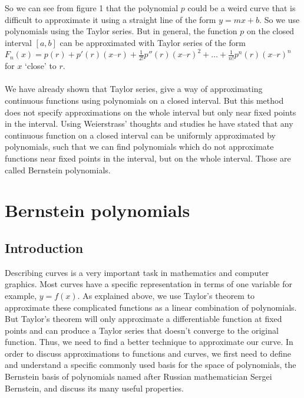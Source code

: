 \documentclass{article}
\begin{document}
So we can see from figure 1 that the polynomial $p$ could be a weird curve that is difficult to approximate it using a straight line of the form $y=mx+b$.
So we use polynomials using the Taylor series.
But in general, the function $p$ on the closed interval $[a,b]$ can be approximated with Taylor series of the form $F_n(x) = p(r) + p'(r)(x – r) + \frac{1}{2!}p''(r) (x – r)^2 + … + \frac{1}{n!} p^n(r)(x – r)^n$ for $x$ `close' to $r$.
\paragraph{}
We have already shown that Taylor series, give a way of approximating continuous functions using polynomials on a closed interval. But this method does not specify approximations on the whole interval but only near fixed points in the interval. Using Weierstrass’ thoughts and studies he have stated that any continuous function on a closed interval can be uniformly approximated by polynomials, such that we can find polynomials which do not approximate functions near fixed points in the interval, but on the whole interval. Those are called Bernstein polynomials.
\section{Bernstein polynomials}
\subsection{Introduction}
Describing curves is a very important task in mathematics and computer graphics. Most curves have a specific  representation in terms of one variable for example, $y = f(x)$. As explained above, we use Taylor’s theorem to approximate these complicated functions as a linear combination of polynomials. But Taylor’s theorem will only approximate a differentiable function at fixed points and can produce a Taylor series that doesn’t converge to the original function. Thus, we need to find a better technique to approximate our curve.
In order to discuss approximations to functions and curves, we first need to define and understand a specific commonly used basis for the space of polynomials, the Bernstein basis of polynomials named after Russian mathematician Sergei Bernstein, and discuss its many useful properties.
\end{document}
